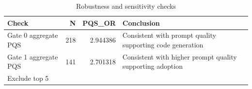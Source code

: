 \begin{table}
\caption{Robustness and sensitivity checks}
\label{tab:sensitivity}
\begin{tabular}{lrrl}
\toprule
Check & N & PQS_OR & Conclusion \\
\midrule
Gate 0 aggregate PQS & 218 & 2.944386 & Consistent with prompt quality supporting code generation \\
Gate 1 aggregate PQS & 141 & 2.701318 & Consistent with higher prompt quality supporting adoption \\
Exclude top 5%
\bottomrule
\end{tabular}
\end{table}
